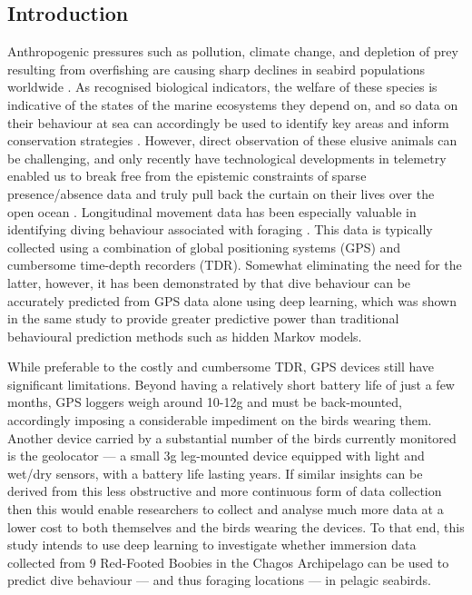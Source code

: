 \documentclass[11pt]{article}
\begin{document}
  \begin{onehalfspace}
  \section{Introduction}
    Anthropogenic pressures such as pollution, climate change, and depletion of prey resulting from overfishing are causing sharp declines in seabird populations worldwide \citep{croxall2012seabird,paleczny2015population}.
    As recognised biological indicators, the welfare of these species is indicative of the states of the marine ecosystems they depend on, and so data on their behaviour at sea can accordingly be used to identify key areas and inform conservation strategies \citep{einoder2009review,mallory2010seabirds}. However, direct observation of these elusive animals can be challenging, and only recently have technological developments in telemetry enabled us to break free from the epistemic constraints of sparse presence/absence data and truly pull back the curtain on their lives over the open ocean \citep{guilford2009migration,maclean2013evaluating}. Longitudinal movement data has been especially valuable in identifying diving behaviour associated with foraging \citep{guilford2008gps}. This data is typically collected using a combination of global positioning systems (GPS) and cumbersome time-depth recorders (TDR). Somewhat eliminating the need for the latter, however, it has been demonstrated by \cite{browning2018predicting} that dive behaviour can be accurately predicted from GPS data alone using deep learning, which was shown in the same study to provide greater predictive power than traditional behavioural prediction methods such as hidden Markov models. 
    
    While preferable to the costly and cumbersome TDR, GPS devices still have significant limitations. Beyond having a relatively short battery life of just a few months, GPS loggers weigh around 10-12g and must be back-mounted, accordingly imposing a considerable impediment on the birds wearing them. Another device carried by a substantial number of the birds currently monitored is the geolocator — a small 3g leg-mounted device equipped with light and wet/dry sensors, with a battery life lasting years. If similar insights can be derived from this less obstructive and more continuous form of data collection then this would enable researchers to collect and analyse much more data at a lower cost to both themselves and the birds wearing the devices. To that end, this study intends to use deep learning to investigate whether immersion data collected from 9 Red-Footed Boobies in the Chagos Archipelago can be used to predict dive behaviour — and thus foraging locations — in pelagic seabirds.
    

\end{onehalfspace}
\end{document}
